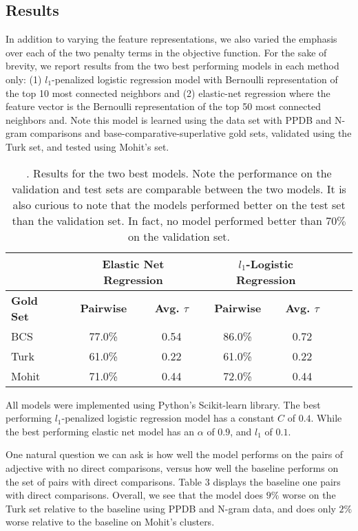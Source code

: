 \subsection{Results}

In addition to varying the feature representations, we also varied the emphasis over each of the two penalty terms in the objective function. For the sake of brevity, we report results from the two best performing models in each method only: (1) $l_1$-penalized logistic regression model with Bernoulli representation of the top 10 most connected neighbors and (2) elastic-net regression where the feature vector is the Bernoulli representation of the top 50 most connected neighbors and. Note this model is learned using the data set with PPDB and N-gram comparisons and base-comparative-superlative gold sets, validated using the Turk set, and tested using Mohit's set.

\begin{table}
\small
\centering
\begin{tabular}{|l|cc|cc|cc|}
	\hline 
	& \multicolumn{2}{c|}{Elastic Net Regression } 
	& \multicolumn{2}{c|}{$l_1$-Logistic Regression} \\
	\hline 
	\bf Gold Set
	& \bf Pairwise & \bf Avg. $\tau$  
	& \bf Pairwise & \bf Avg. $\tau$  \\ 
	\hline
	BCS   & 77.0\% & 0.54 & 86.0\%  &  0.72 \\
	Turk  & 61.0\% & 0.22 & 61.0\%  &  0.22 \\
	Mohit & 71.0\% & 0.44 & 72.0\%  &  0.44 \\
	\hline
\end{tabular}
\caption{\label{font-table}. Results for the two best models. Note the performance on the validation and test sets are comparable between the two models. It is also curious to note that the models performed better on the test set than the validation set. In fact, no model performed better than $70\%$ on the validation set. }
\end{table}

All models were implemented using Python's Scikit-learn library. The best performing $l_1$-penalized logistic regression model has a constant $C$ of $0.4$. While the best performing elastic net model has an $\alpha$ of $0.9$, and $l_1$ of $0.1$. 

One natural question we can ask is how well the model performs on the pairs of adjective with no direct comparisons, versus how well the baseline performs on the set of pairs with direct comparisons. Table 3 displays the baseline one pairs with direct comparisons. Overall, we see that the model does $9\%$ worse on the Turk set relative to the baseline using PPDB and N-gram data, and does only $2\%$ worse relative to the baseline on Mohit's clusters.



